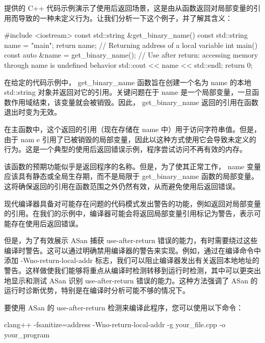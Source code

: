 
提供的 C++ 代码示例演示了使用后返回场景，这是由从函数返回对局部变量的引用而导致的一种未定义行为。让我们分析一下这个例子，并了解其含义：

\begin{cpp}
#include <iostream>
const std::string &get_binary_name() {
    const std::string name = "main";
    return name; // Returning address of a local variable
}
int main() {
    const auto &name = get_binary_name();
    // Use after return: accessing memory through name is undefined behavior
    std::cout << name << std::endl;
    return 0;
}
\end{cpp}

在给定的代码示例中， get\_binary\_name 函数旨在创建一个名为 name 的本地 std::string 对象并返回对它的引用。关键问题在于 name 是一个局部变量，一旦函数作用域结束，该变量就会被销毁。因此， get\_binary\_name 返回的引用在函数退出时变为无效。

在主函数中，这个返回的引用（现在存储在 name 中）用于访问字符串值。但是，由于 nam e 引用了已被销毁的局部变量，因此以这种方式使用它会导致未定义的行为。这是一个典型的使用后返回错误示例，程序尝试访问不再有效的内存。

该函数的预期功能似乎是返回程序的名称。但是，为了使其正常工作， name 变量应该具有静态或全局生存期，而不是局限于 get\_binary\_name 函数的局部变量。这将确保返回的引用在函数范围之外仍然有效，从而避免使用后返回错误。

现代编译器具备对可能存在问题的代码模式发出警告的功能，例如返回对局部变量的引用。在我们的示例中，编译器可能会将返回局部变量引用标记为警告，表示可能存在使用后返回错误。

但是，为了有效展示 ASan 捕获 use-after-return 错误的能力，有时需要绕过这些编译时警告。这可以通过明确禁用编译器的警告来实现。例如，通过在编译命令中添加 -Wno-return-local-addr 标志，我们可以阻止编译器发出有关返回本地地址的警告。这样做使我们能够将重点从编译时检测转移到运行时检测，其中可以更突出地显示和测试 ASan 识别 use-after-return 错误的能力。这种方法强调了 ASan 的运行时诊断优势，特别是在编译时分析可能不够的情况下。


要使用 ASan 的 use-after-return 检测来编译此程序，您可以使用以下命令：

\begin{shell}
clang++ -fsanitize=address -Wno-return-local-addr -g your_file.cpp -o your_program
\end{shell}

